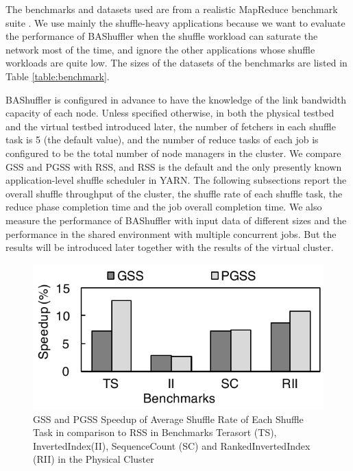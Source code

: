 \documentclass[10pt,journal,compsoc]{IEEEtran}
\begin{document}
The benchmarks and datasets used are from a realistic MapReduce benchmark suite \cite{ahmad2012puma}. 
We use mainly the shuffle-heavy applications because we want to evaluate the
performance of BAShuffler when the shuffle workload can saturate the
network most of the time,
and ignore the other applications whose shuffle workloads are quite
low. %
The sizes of the datasets of the benchmarks are listed in Table \ref{table:benchmark}.

BAShuffler is configured in advance to have the knowledge of
the link bandwidth capacity of each node.
Unless specified otherwise, %
in both the physical testbed and the virtual testbed introduced later, 
the number of fetchers in each shuffle task is 5 (the default value), 
and the number of reduce tasks of each job is configured to
be the total number of node managers in the cluster.
We compare GSS and PGSS with RSS, and RSS is the default and the only
presently known application-level shuffle scheduler in YARN. 
The following subsections report the overall shuffle throughput of
the cluster, the shuffle rate of each shuffle task, the reduce phase
completion time and the job overall completion time.
We also measure the performance of BAShuffler with input data of
different sizes
and the performance in the shared environment with multiple concurrent jobs. 
But the results will be introduced later together with the results of the virtual cluster. 

\begin{figure}
\centering
\includegraphics[width=0.7\columnwidth,height=0.35\columnwidth]{figure6}
\caption{GSS and PGSS Speedup of Average Shuffle Rate of Each Shuffle Task in comparison to RSS in Benchmarks Terasort (TS), InvertedIndex(II), SequenceCount (SC) and RankedInvertedIndex (RII) in the Physical Cluster} 
\label{fig:new_shuffle_rate}
\end{figure}
\end{document}
